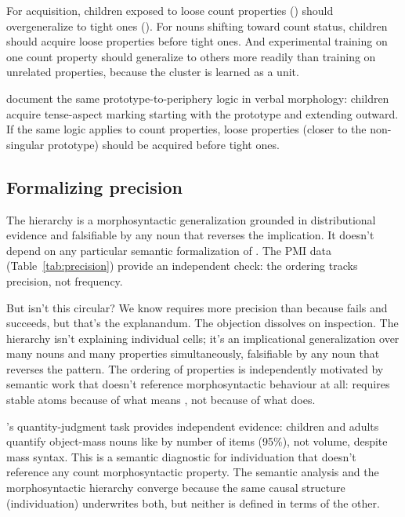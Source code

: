 \documentclass[12pt,a4paper]{article}
\begin{document}
For acquisition, children exposed to loose count properties () should overgeneralize to tight ones (). For nouns shifting toward count status, children should acquire loose properties before tight ones. And experimental training on one count property should generalize to others more readily than training on unrelated properties, because the cluster is learned as a unit.

\textcite{shirai1995} document the same prototype-to-periphery logic in verbal morphology: children acquire tense-aspect marking starting with the prototype and extending outward. If the same logic applies to count properties, loose properties (closer to the non-singular prototype) should be acquired before tight ones.

\subsection{Formalizing precision}\label{sec:precision-formal}

The hierarchy is a morphosyntactic generalization grounded in distributional evidence and falsifiable by any noun that reverses the implication. It doesn't depend on any particular semantic formalization of . The PMI data (Table~\ref{tab:precision}) provide an independent check: the ordering tracks precision, not frequency.

But isn't this circular? We know  requires more precision than  because  fails and  succeeds, but that's the explanandum. The objection dissolves on inspection. The hierarchy isn't explaining individual cells; it's an implicational generalization over many nouns and many properties simultaneously, falsifiable by any noun that reverses the pattern. The ordering of properties is independently motivated by semantic work that doesn't reference morphosyntactic behaviour at all:  requires stable atoms because of what  means \citep{rothstein2010,grimm2018}, not because of what  does.

\textcite{barner2005}'s quantity-judgment task provides independent evidence: children and adults quantify object-mass nouns like  by number of items (95\%), not volume, despite mass syntax. This is a semantic diagnostic for individuation that doesn't reference any count morphosyntactic property. The semantic analysis and the morphosyntactic hierarchy converge because the same causal structure (individuation) underwrites both, but neither is defined in terms of the other.
\end{document}
